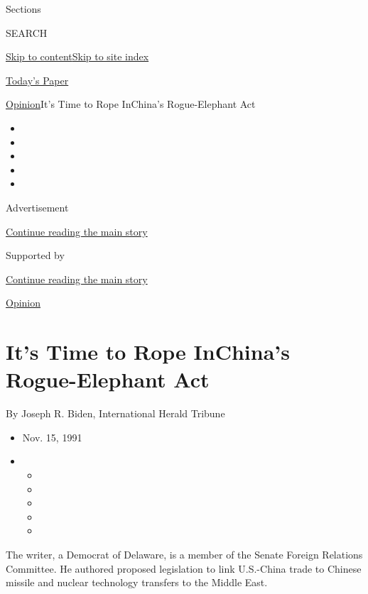 Sections

SEARCH

\protect\hyperlink{site-content}{Skip to
content}\protect\hyperlink{site-index}{Skip to site index}

\href{https://myaccount.nytimes3xbfgragh.onion/auth/login?response_type=cookie\&client_id=vi}{}

\href{https://www.nytimes3xbfgragh.onion/section/todayspaper}{Today's
Paper}

\href{/section/opinion}{Opinion}\textbar{}It's Time to Rope InChina's
Rogue-Elephant Act

\begin{itemize}
\item
\item
\item
\item
\item
\end{itemize}

Advertisement

\protect\hyperlink{after-top}{Continue reading the main story}

Supported by

\protect\hyperlink{after-sponsor}{Continue reading the main story}

\href{/section/opinion}{Opinion}

\hypertarget{its-time-to-rope-inchinas-rogue-elephant-act}{%
\section{It's Time to Rope InChina's Rogue-Elephant
Act}\label{its-time-to-rope-inchinas-rogue-elephant-act}}

By Joseph R. Biden, International Herald Tribune

\begin{itemize}
\item
  Nov. 15, 1991
\item
  \begin{itemize}
  \item
  \item
  \item
  \item
  \item
  \end{itemize}
\end{itemize}

The writer, a Democrat of Delaware, is a member of the Senate Foreign
Relations Committee. He authored proposed legislation to link U.S.-China
trade to Chinese missile and nuclear technology transfers to the Middle
East.

